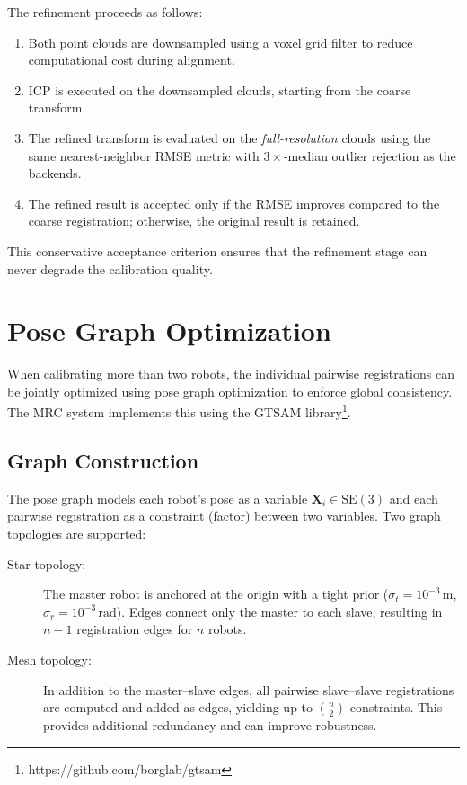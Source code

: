 The refinement proceeds as follows:
\begin{enumerate}
    \item Both point clouds are downsampled using a voxel grid filter to
          reduce computational cost during alignment.
    \item ICP is executed on the downsampled clouds, starting from the coarse
          transform.
    \item The refined transform is evaluated on the \emph{full-resolution}
          clouds using the same nearest-neighbor RMSE metric with
          $3\times$-median outlier rejection as the backends.
    \item The refined result is accepted only if the RMSE improves compared
          to the coarse registration; otherwise, the original result is retained.
\end{enumerate}

This conservative acceptance criterion ensures that the refinement stage can
never degrade the calibration quality.

\section{Pose Graph Optimization}
\label{sec:pose_graph}

When calibrating more than two robots, the individual pairwise registrations
can be jointly optimized using pose graph optimization to enforce global
consistency.
The MRC system implements this using the GTSAM
library\footnote{https://github.com/borglab/gtsam}.

\subsection{Graph Construction}

The pose graph models each robot's pose as a variable
$\mathbf{X}_i \in \mathrm{SE}(3)$ and each pairwise registration as a
constraint (factor) between two variables.
Two graph topologies are supported:

\begin{description}
    \item[Star topology:]
        The master robot is anchored at the origin with a tight prior
        ($\sigma_t = 10^{-3}\,\mathrm{m}$, $\sigma_r = 10^{-3}\,\mathrm{rad}$).
        Edges connect only the master to each slave, resulting in
        $n - 1$ registration edges for $n$ robots.
    \item[Mesh topology:]
        In addition to the master--slave edges, all pairwise slave--slave
        registrations are computed and added as edges, yielding up to
        $\binom{n}{2}$ constraints.
        This provides additional redundancy and can improve robustness.
\end{description}

